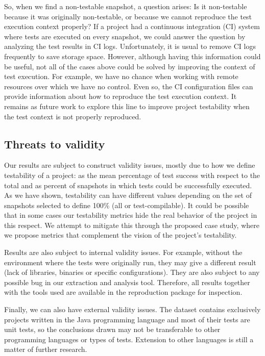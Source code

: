 So, when we find a non-testable snapshot, a question arises: Is it non-testable because it was originally non-testable, or because we cannot reproduce the test execution context properly? 
If a project had a continuous integration (CI) system where tests are executed on every snapshot, we could answer the question by analyzing the test results in CI logs. Unfortunately, it is usual to remove CI logs frequently to save storage space. 
However, although having this information could be useful, not all of the cases above could be solved by improving the context of test execution. 
For example, we have no chance when working with remote resources over which we have no control.
Even so, the CI configuration files can provide information about how to reproduce the test execution context.
It remains as future work to explore this line to improve project testability when the test context is not properly reproduced. 


\subsection{Threats to validity}

Our results are subject to construct validity issues, mostly due to how we define testability of a project: as the mean percentage of test success with respect to the total and as percent of snapshots in which tests could be successfully executed. 
As we have shown, testability can have different values depending on the set of snapshots selected to define 100\% (all or test-compilable). 
It could be possible that in some cases our testability metrics hide the real behavior of the project in this respect.
We attempt to mitigate this through the proposed case study, where we propose metrics that complement the vision of the project's testability.

Results are also subject to internal validity issues. 
For example, without the environment where the tests were originally run, they may give a different result (lack of libraries, binaries or specific configurations). 
They are also subject to any possible bug in our extraction and analysis tool. 
Therefore, all results together with the tools used are available in the reproduction package for inspection.

Finally, we can also have external validity issues. 
The dataset contains exclusively projects written in the Java programming language and most of their tests are unit tests, so the conclusions drawn may not be transferable to other programming languages or types of tests. 
Extension to other languages is still a matter of further research.
